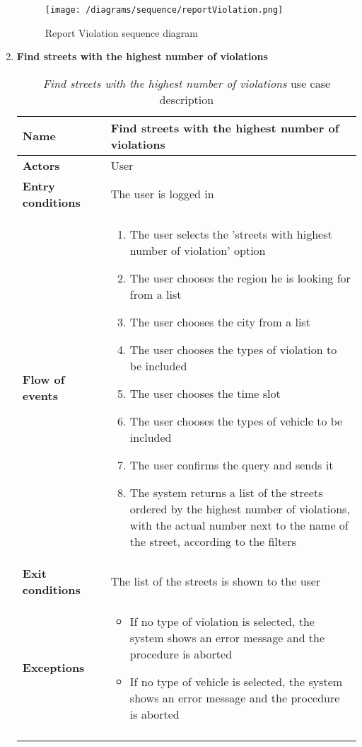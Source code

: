 \begin{enumerate}
				\begin{figure}[h]
					\centering 
					\texttt{[image: /diagrams/sequence/reportViolation.png]}
					\caption{Report Violation sequence diagram}
				\end{figure}
			
				\FloatBarrier
			\item \textbf{Find streets with the highest number of violations}
				\begin{longtable}{p{0.26\linewidth}p{0.75\linewidth}}
					\toprule
					\textbf{Name} & \textbf{Find streets with the highest number of violations} \\
					\midrule
					\textbf{Actors} & User \\
					\midrule
					\textbf{Entry conditions} & The user is logged in \\
					\midrule
					\textbf{Flow of events} & 
					\begin{enumerate}
						\item The user selects the 'streets with highest number of violation' option
						\item The user chooses the region he is looking for from a list
						\item The user chooses the city from a list
						\item The user chooses the types of violation to be included
						\item The user chooses the time slot
						\item The user chooses the types of vehicle to be included
						\item The user confirms the query and sends it
						\item The system returns a list of the streets ordered by the highest number of violations, with the actual number next to the name of the street, according to the filters
					\end{enumerate} \\
					\midrule
					\textbf{Exit conditions} & The list of the streets is shown to the user \\
					\midrule
					\textbf{Exceptions} & 
					\begin{itemize}
						\item If no type of violation is selected, the system shows an error message and the procedure is aborted
						\item If no type of vehicle is selected, the system shows an error message and the procedure is aborted	
					\end{itemize} \\
					\bottomrule
					\caption{\emph{Find streets with the highest number of violations} use case description}
				\end{longtable}
			

\end{enumerate}
